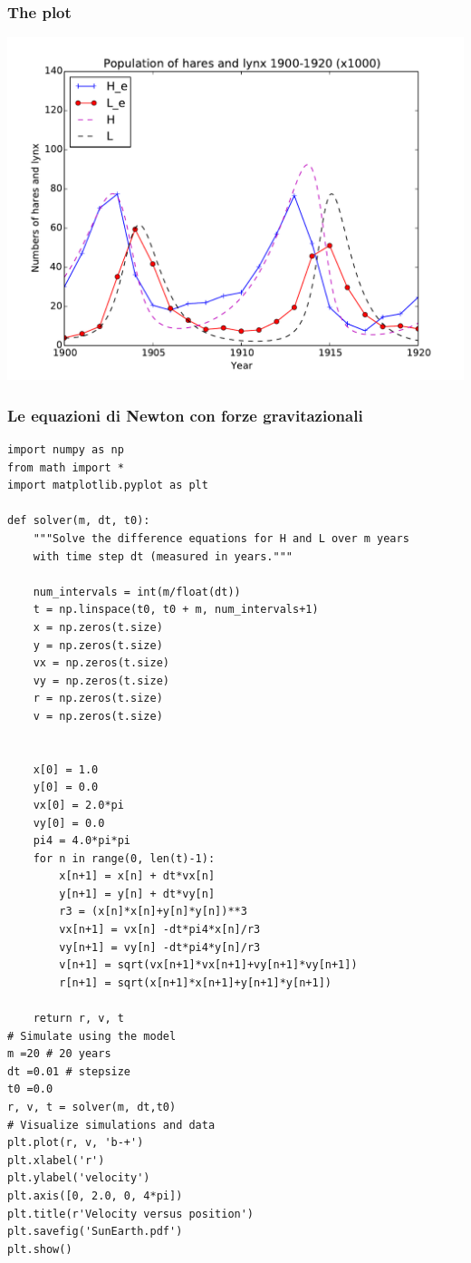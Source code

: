 \documentclass{beamer}
\begin{document}
\begin{frame}
\frametitle{The plot}

\vspace{6mm}

\centerline{\includegraphics[width=0.9\linewidth]{fig/Hudson_Bay_sim.pdf}}

\vspace{6mm}
\end{frame}

\begin{frame}
\frametitle{Le equazioni di Newton con forze gravitazionali}

\begin{block}{}
\begin{verbatim}
import numpy as np
from math import *
import matplotlib.pyplot as plt

def solver(m, dt, t0):
    """Solve the difference equations for H and L over m years
    with time step dt (measured in years."""

    num_intervals = int(m/float(dt))
    t = np.linspace(t0, t0 + m, num_intervals+1)
    x = np.zeros(t.size)
    y = np.zeros(t.size)
    vx = np.zeros(t.size)
    vy = np.zeros(t.size)
    r = np.zeros(t.size)
    v = np.zeros(t.size)


    x[0] = 1.0
    y[0] = 0.0
    vx[0] = 2.0*pi
    vy[0] = 0.0
    pi4 = 4.0*pi*pi
    for n in range(0, len(t)-1):
        x[n+1] = x[n] + dt*vx[n]
        y[n+1] = y[n] + dt*vy[n]
        r3 = (x[n]*x[n]+y[n]*y[n])**3
        vx[n+1] = vx[n] -dt*pi4*x[n]/r3
        vy[n+1] = vy[n] -dt*pi4*y[n]/r3
        v[n+1] = sqrt(vx[n+1]*vx[n+1]+vy[n+1]*vy[n+1])
        r[n+1] = sqrt(x[n+1]*x[n+1]+y[n+1]*y[n+1])

    return r, v, t
# Simulate using the model
m =20 # 20 years
dt =0.01 # stepsize
t0 =0.0
r, v, t = solver(m, dt,t0)
# Visualize simulations and data
plt.plot(r, v, 'b-+')
plt.xlabel('r')
plt.ylabel('velocity')
plt.axis([0, 2.0, 0, 4*pi])
plt.title(r'Velocity versus position')
plt.savefig('SunEarth.pdf')
plt.show()

\end{verbatim}
\end{block}
\end{frame}
\end{document}
